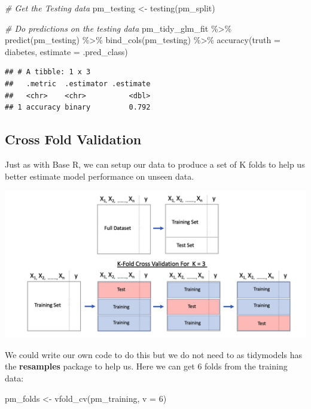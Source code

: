 \documentclass[
]{article}
\newenvironment{Shaded}{\begin{snugshade}}{\end{snugshade}}
\newcommand{\AttributeTok}[1]{\textcolor[rgb]{0.77,0.63,0.00}{#1}}
\newcommand{\CommentTok}[1]{\textcolor[rgb]{0.56,0.35,0.01}{\textit{#1}}}
\newcommand{\DecValTok}[1]{\textcolor[rgb]{0.00,0.00,0.81}{#1}}
\newcommand{\FunctionTok}[1]{\textcolor[rgb]{0.00,0.00,0.00}{#1}}
\newcommand{\NormalTok}[1]{#1}
\newcommand{\OtherTok}[1]{\textcolor[rgb]{0.56,0.35,0.01}{#1}}
\newcommand{\SpecialCharTok}[1]{\textcolor[rgb]{0.00,0.00,0.00}{#1}}
\begin{document}
\begin{Shaded}
\begin{Highlighting}[]
\CommentTok{\# Get the Testing data}
\NormalTok{pm\_testing }\OtherTok{\textless{}{-}} \FunctionTok{testing}\NormalTok{(pm\_split)}

\CommentTok{\# Do predictions on the testing data}
\NormalTok{pm\_tidy\_glm\_fit }\SpecialCharTok{\%\textgreater{}\%}
  \FunctionTok{predict}\NormalTok{(pm\_testing) }\SpecialCharTok{\%\textgreater{}\%}
  \FunctionTok{bind\_cols}\NormalTok{(pm\_testing) }\SpecialCharTok{\%\textgreater{}\%}
  \FunctionTok{accuracy}\NormalTok{(}\AttributeTok{truth =}\NormalTok{ diabetes, }\AttributeTok{estimate =}\NormalTok{ .pred\_class)}
\end{Highlighting}
\end{Shaded}

\begin{verbatim}
## # A tibble: 1 x 3
##   .metric  .estimator .estimate
##   <chr>    <chr>          <dbl>
## 1 accuracy binary         0.792
\end{verbatim}

\hypertarget{cross-fold-validation-1}{%
\subsection{Cross Fold Validation}\label{cross-fold-validation-1}}

Just as with Base R, we can setup our data to produce a set of K folds
to help us better estimate model performance on unseen data.

\includegraphics[width=1.2\textwidth,height=\textheight]{./IMG/crossfold.png}

We could write our own code to do this but we do not need to as
tidymodels has the \textbf{resamples} package to help us. Here we can
get 6 folds from the training data:

\begin{Shaded}
\begin{Highlighting}[]
\NormalTok{pm\_folds }\OtherTok{\textless{}{-}} \FunctionTok{vfold\_cv}\NormalTok{(pm\_training, }\AttributeTok{v =} \DecValTok{6}\NormalTok{)}
\end{Highlighting}
\end{Shaded}
\end{document}
